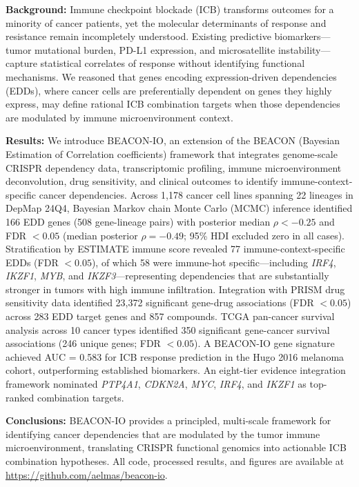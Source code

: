 \documentclass[12pt]{article}
\begin{document}
\textbf{Background:} Immune checkpoint blockade (ICB) transforms outcomes for a minority of cancer patients, yet the molecular determinants of response and resistance remain incompletely understood. Existing predictive biomarkers---tumor mutational burden, PD-L1 expression, and microsatellite instability---capture statistical correlates of response without identifying functional mechanisms. We reasoned that genes encoding expression-driven dependencies (EDDs), where cancer cells are preferentially dependent on genes they highly express, may define rational ICB combination targets when those dependencies are modulated by immune microenvironment context.

\textbf{Results:} We introduce BEACON-IO, an extension of the BEACON (Bayesian Estimation of Correlation coefficients) framework that integrates genome-scale CRISPR dependency data, transcriptomic profiling, immune microenvironment deconvolution, drug sensitivity, and clinical outcomes to identify immune-context-specific cancer dependencies. Across 1,178 cancer cell lines spanning 22 lineages in DepMap 24Q4, Bayesian Markov chain Monte Carlo (MCMC) inference identified 166 EDD genes (508 gene-lineage pairs) with posterior median $\rho < -0.25$ and FDR $< 0.05$ (median posterior $\rho = -0.49$; 95\% HDI excluded zero in all cases). Stratification by ESTIMATE immune score revealed 77 immune-context-specific EDDs (FDR $< 0.05$), of which 58 were immune-hot specific---including \textit{IRF4}, \textit{IKZF1}, \textit{MYB}, and \textit{IKZF3}---representing dependencies that are substantially stronger in tumors with high immune infiltration. Integration with PRISM drug sensitivity data identified 23,372 significant gene-drug associations (FDR $< 0.05$) across 283 EDD target genes and 857 compounds. TCGA pan-cancer survival analysis across 10 cancer types identified 350 significant gene-cancer survival associations (246 unique genes; FDR $< 0.05$). A BEACON-IO gene signature achieved AUC = 0.583 for ICB response prediction in the Hugo 2016 melanoma cohort, outperforming established biomarkers. An eight-tier evidence integration framework nominated \textit{PTP4A1}, \textit{CDKN2A}, \textit{MYC}, \textit{IRF4}, and \textit{IKZF1} as top-ranked combination targets.

\textbf{Conclusions:} BEACON-IO provides a principled, multi-scale framework for identifying cancer dependencies that are modulated by the tumor immune microenvironment, translating CRISPR functional genomics into actionable ICB combination hypotheses. All code, processed results, and figures are available at \url{https://github.com/aelmas/beacon-io}.
\end{document}

